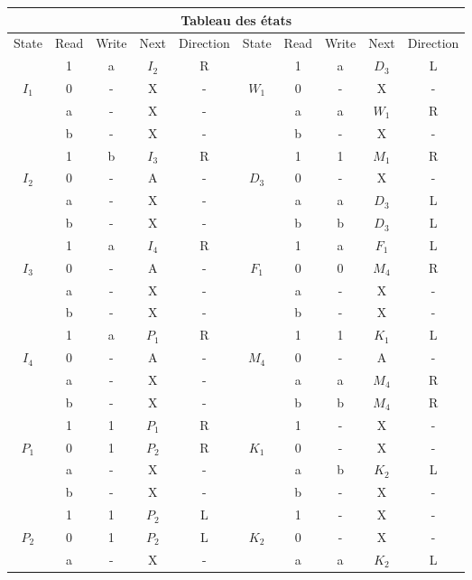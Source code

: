 \documentclass{article}
\begin{document}
\begin{center}
  \begin{tabular}{c|c|c|c|c||c|c|c|c|c}
    
    \multicolumn{10}{c}{Tableau des états}\\
    \toprule
    State & Read & Write & Next & Direction & State & Read & Write & Next & Direction \\ \hline\hline
    & 1 & a & $I_2$ & R &       & 1 & a & $D_3$ & L\\
    $I_1$ & 0 & - & X     & - & $W_1$ & 0 & - & X    & -\\
    & a & - & X     & - &       & a & a & $W_1$ & R\\
    & b & - & X     & - &       & b & - & X    & -\\\hline
    & 1 & b & $I_3$ & R &       & 1 & 1 & $M_1$ & R\\
    $I_2$ & 0 & - & A     & - & $D_3$ & 0 & - & X    & -\\
    & a & - & X     & - &       & a & a & $D_3$ & L\\
    & b & - & X     & - &       & b & b & $D_3$ & L\\\hline
    & 1 & a & $I_4$ & R &       & 1 & a & $F_1$ & L\\
    $I_3$ & 0 & - & A     & - & $F_1$ & 0 & 0 & $M_4$ & R\\
    & a & - & X     & - &       & a & - & X    & -\\
    & b & - & X     & - &       & b & - & X    & -\\\hline
    & 1 & a & $P_1$ & R &       & 1 & 1 & $K_1$ & L\\
    $I_4$ & 0 & - & A     & - & $M_4$ & 0 & - & A    & -\\
    & a & - & X     & - &       & a & a & $M_4$ & R\\
    & b & - & X     & - &       & b & b & $M_4$ & R\\\hline
    & 1 & 1 & $P_1$ & R &       & 1 & - & X    & -\\
    $P_1$ & 0 & 1 & $P_2$ & R & $K_1$ & 0 & - & X    & -\\
    & a & - & X     & - &       & a & b & $K_2$ & L\\
    & b & - & X     & - &       & b & - & X    & -\\\hline
    & 1 & 1 & $P_2$ & L &       & 1 & - & X    & -\\
    $P_2$ & 0 & 1 & $P_2$ & L & $K_2$ & 0 & - & X    & -\\
    & a & - & X     & - &       & a & a & $K_2$ & L\\

\end{tabular}
\end{center}
\end{document}
